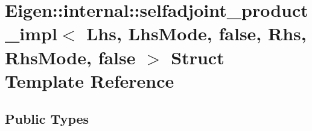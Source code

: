 \hypertarget{struct_eigen_1_1internal_1_1selfadjoint__product__impl_3_01_lhs_00_01_lhs_mode_00_01false_00_01_0e7941e7b3bc2131c413f23ec856f76c}{}\section{Eigen\+:\+:internal\+:\+:selfadjoint\+\_\+product\+\_\+impl$<$ Lhs, Lhs\+Mode, false, Rhs, Rhs\+Mode, false $>$ Struct Template Reference}
\label{struct_eigen_1_1internal_1_1selfadjoint__product__impl_3_01_lhs_00_01_lhs_mode_00_01false_00_01_0e7941e7b3bc2131c413f23ec856f76c}
\subsection*{Public Types}
